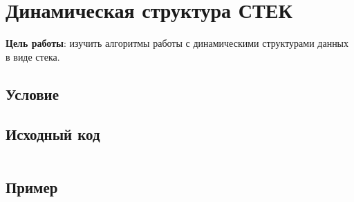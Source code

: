 
\usepackage{minted}





\section{Динамическая структура СТЕК}

\textbf{Цель работы}: изучить алгоритмы работы с динамическими структурами данных в виде стека.

\subsection{Условие}



\subsection{Исходный код}
\inputminted[fontsize=\footnotesize]{c}{../task.c}

\subsection{Пример}
\inputminted[fontsize=\footnotesize]{text}{examples/example.txt}


